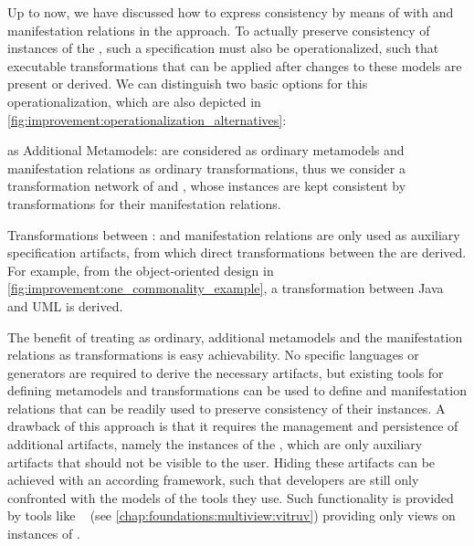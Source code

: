 Up to now, we have discussed how to express consistency by means of \conceptmetamodels with \commonalities and manifestation relations in the \commonalities approach.
To actually preserve consistency of instances of the \concretemetamodels, such a specification must also be operationalized, such that executable transformations that can be applied after changes to these models are present or derived.
We can distinguish two basic options for this operationalization, which are also depicted in \autoref{fig:improvement:operationalization_alternatives}:
\begin{properdescription}
    \item[\ConceptMetamodels as Additional Metamodels:] \Conceptmetamodels are considered as ordinary metamodels and manifestation relations as ordinary transformations, thus we consider a transformation network of \concretemetamodels and \conceptmetamodels, whose instances are kept consistent by transformations for their manifestation relations. %
    \item[Transformations between \ConcreteMetamodels:] \Conceptmetamodels and manifestation relations are only used as auxiliary specification artifacts, from which direct transformations between the \concretemetamodels are derived. For example, from the object-oriented design \conceptmetamodel in \autoref{fig:improvement:one_commonality_example}, a transformation between Java and \gls{UML} is derived.
\end{properdescription}

The benefit of treating \conceptmetamodels as ordinary, additional metamodels and the manifestation relations as transformations is easy achievability.
No specific languages or generators are required to derive the necessary artifacts, but existing tools for defining metamodels and transformations can be used to define \conceptmetamodels and manifestation relations that can be readily used to preserve consistency of their instances.
A drawback of this approach is that it requires the management and persistence of additional artifacts, namely the instances of the \conceptmetamodels, which are only auxiliary artifacts that should not be visible to the user.
Hiding these artifacts can be achieved with an according framework, such that developers are still only confronted with the models of the tools they use.
Such functionality is provided by tools like \vitruv~ (see \autoref{chap:foundations:multiview:vitruv}) providing only views on instances of \concretemetamodels.

